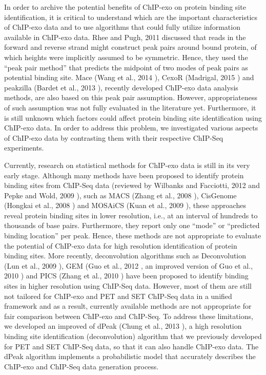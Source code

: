 \documentclass[11pt]{article}\usepackage[]{graphicx}\usepackage[]{color}
\begin{document}
In order to archive the potential benefits of ChIP-exo on protein
binding site identification, it is critical to understand which are
the important characteristics of ChIP-exo data and to use algorithms
that could fully utilize information available in ChIP-exo data. Rhee
and Pugh, 2011 \cite{exo1} discussed that reads in the forward and
reverse strand might construct peak pairs around bound protein, of
which heights were implicitly assumed to be symmetric. Hence, they
used the ``peak pair method'' that predicts the midpoint of two modes
of peak pairs as potential binding site. Mace (Wang et al., 2014
\cite{mace}), CexoR (Madrigal, 2015 \cite{cexor}) and peakzilla
(Bardet et al., 2013 \cite{peakzilla}), recently developed ChIP-exo
data analysis methods, are also based on this peak pair
assumption. However, appropriateness of such assumption was not fully
evaluated in the literature yet.  Furthermore, it is still unknown
which factors could affect protein binding site identification using
ChIP-exo data. In order to address this problem, we investigated
various aspects of ChIP-exo data by contrasting them with their
respective ChIP-Seq experiments.

Currently, research on statistical methods for ChIP-exo data is still
in its very early stage. Although many methods have been proposed to
identify protein binding sites from ChIP-Seq data (reviewed by
Wilbanks and Facciotti, 2012 \cite{evaluation} and Pepke and Wold,
2009 \cite{computation}), such as MACS (Zhang et al., 2008
\cite{macs}), CisGenome (Hongkai et al., 2008 \cite{cisgenome}) and
MOSAiCS (Kuan et al., 2009 \cite{mosaics}), these approaches reveal
protein binding sites in lower resolution, i.e., at an interval of
hundreds to thousands of base pairs. Furthermore, they report only one
``mode'' or ``predicted binding location'' per peak. Hence, these
methods are not appropriate to evaluate the potential of ChIP-exo data
for high resolution identification of protein binding sites. More
recently, deconvolution algorithms such as Deconvolution (Lun et al.,
2009 \cite{csdeconv}), GEM (Guo et al., 2012 \cite{gem}, an improved
version of Guo et al., 2010 \cite{gps} ) and PICS (Zhang et al., 2010
\cite{pics}) have been proposed to identify binding sites in higher
resolution using ChIP-Seq data. However, most of them are still not
tailored for ChIP-exo and PET and SET ChIP-Seq data in a unified
framework and as a result, currently available methods are not
appropriate for fair comparison between ChIP-exo and ChIP-Seq. To
address these limitations, we developed an improved of dPeak (Chung et
al., 2013 \cite{dpeak}), a high resolution binding site identification
(deconvolution) algorithm that we previously developed for PET and SET
ChIP-Seq data, so that it can also handle ChIP-exo data. The dPeak
algorithm implements a probabilistic model that accurately describes
the ChIP-exo and ChIP-Seq data generation process.
\end{document}
